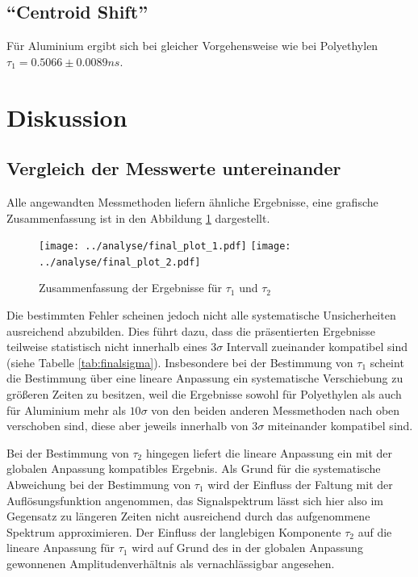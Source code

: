 \documentclass[a4paper,12pt]{article}
\begin{document}
\FloatBarrier
\subsection{"`Centroid Shift"'}
Für Aluminium ergibt sich bei gleicher Vorgehensweise wie bei Polyethylen $τ_1 = 0.5066 \pm 0.0089
\si{ns}$.

\section{Diskussion}
\subsection{Vergleich der Messwerte untereinander}
Alle angewandten Messmethoden liefern ähnliche Ergebnisse, eine grafische Zusammenfassung ist in den
Abbildung \ref{fig:finalt} dargestellt.

\begin{figure}[h]
	\texttt{[image: ../analyse/final\_plot\_1.pdf]}
	\texttt{[image: ../analyse/final\_plot\_2.pdf]}
	\caption{Zusammenfassung der Ergebnisse für $\tau_{1}$ und $\tau_{2}$  }
	\label{fig:finalt}
\end{figure}

Die bestimmten Fehler scheinen jedoch nicht alle systematische Unsicherheiten ausreichend abzubilden.
Dies führt dazu, dass die präsentierten Ergebnisse teilweise statistisch nicht innerhalb eines $3\sigma$ Intervall
zueinander kompatibel sind (siehe Tabelle \ref{tab:finalsigma}). Insbesondere bei der Bestimmung von $\tau_{1}$ scheint die Bestimmung über eine
lineare Anpassung ein systematische Verschiebung zu größeren Zeiten zu besitzen, weil die Ergebnisse
sowohl für Polyethylen als auch für Aluminium mehr als
$10σ$ von den beiden anderen Messmethoden nach oben verschoben sind, diese aber jeweils innerhalb von
$3σ$ miteinander kompatibel sind.

Bei der Bestimmung von $\tau_{2}$
hingegen liefert die lineare Anpassung ein mit der globalen Anpassung kompatibles Ergebnis. Als Grund für die systematische Abweichung bei der
Bestimmung von $\tau_{1}$ wird der Einfluss der Faltung mit der Auflösungsfunktion angenommen, das Signalspektrum lässt sich hier also im Gegensatz zu längeren
Zeiten nicht ausreichend durch das aufgenommene Spektrum approximieren. Der Einfluss der langlebigen Komponente $\tau_{2}$ auf die lineare Anpassung für $\tau_{1}$
wird auf Grund des in der globalen Anpassung gewonnenen Amplitudenverhältnis als vernachlässigbar angesehen.
\end{document}
